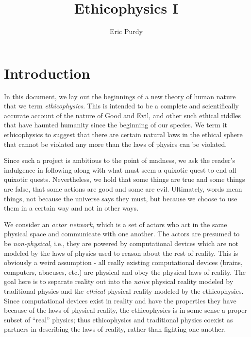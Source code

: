 \documentclass{article}
\title{Ethicophysics I}
\author{Eric Purdy}
\begin{document}
\maketitle

\begin{abstract}
\end{abstract}

\section{Introduction}

In this document, we lay out the beginnings of a new theory of human
nature that we term {\em ethicophysics}. This is intended to be a
complete and scientifically accurate account of the nature of Good and
Evil, and other such ethical riddles that have haunted humanity since
the beginning of our species. We term it ethicophysics to suggest that
there are certain natural laws in the ethical sphere that cannot be
violated any more than the laws of physics can be violated.

Since such a project is ambitious to the point of madness, we ask the
reader's indulgence in following along with what must seem a quixotic
quest to end all quixotic quests. Nevertheless, we hold that some
things are true and some things are false, that some actions are good
and some are evil. Ultimately, words mean things, not because the
universe says they must, but because we choose to use them in a
certain way and not in other ways.

We consider an {\em actor network}, which is a set of actors who act
in the same physical space and communicate with one another. The
actors are presumed to be {\em non-physical}, i.e., they are powered
by computational devices which are not modeled by the laws of physics
used to reason about the rest of reality. This is obviously a weird
assumption - all really existing computational devices (brains,
computers, abacuses, etc.) are physical and obey the physical laws of
reality. The goal here is to separate reality out into the {\em naive}
physical reality modeled by traditional physics and the {\em ethical}
physical reality modeled by the ethicophysics. Since computational
devices exist in reality and have the properties they have because of
the laws of physical reality, the ethicophysics is in some sense a
proper subset of ``real'' physics; thus ethicophysics and traditional
physics coexist as partners in describing the laws of reality, rather
than fighting one another.
\end{document}
